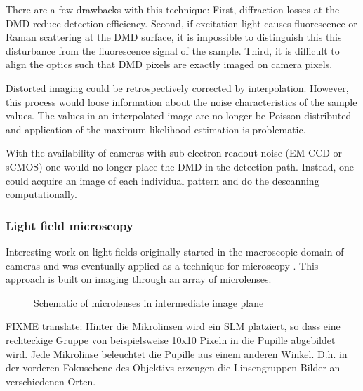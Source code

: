 There are a few drawbacks with this technique: First, diffraction
losses at the DMD reduce detection efficiency. Second, if excitation
light causes fluorescence or Raman scattering at the DMD surface, it
is impossible to distinguish this this disturbance from the
fluorescence signal of the sample. Third, it is difficult to align the
optics such that DMD pixels are exactly imaged on camera pixels. 

Distorted imaging could be retrospectively corrected by
interpolation. However, this process would loose information about the
noise characteristics of the sample values. The values in an
interpolated image are no longer be Poisson distributed and
application of the maximum likelihood estimation is problematic.

With the availability of cameras with sub-electron readout noise
(EM-CCD or sCMOS) one would no longer place the DMD in the detection
path. Instead, one could acquire an image of each individual pattern
and do the descanning computationally.


%
%
%

\subsubsection{Light field microscopy}
\label{sec:light-field-microscopy}
Interesting work on light fields originally started in the macroscopic
domain of cameras \citep{Lippmann1908%
} and was eventually applied as a technique for microscopy
\citep{Levoy2006,Levoy2009,Zhang2009}. This approach is built on
imaging through an array of microlenses.
\begin{figure}[!hbt]
  \centering
  \caption{Schematic of microlenses in intermediate image plane
    \citep[inspired from][]{Levoy2006}}
  \label{fig:microlens-levoy-sketch}
\end{figure}

FIXME translate: Hinter die Mikrolinsen wird ein SLM platziert, so
dass eine rechteckige Gruppe von beispielsweise 10x10 Pixeln in die
Pupille abgebildet wird. Jede Mikrolinse beleuchtet die Pupille aus
einem anderen Winkel. D.h. in der vorderen Fokusebene des Objektivs
erzeugen die Linsengruppen Bilder an verschiedenen Orten.

